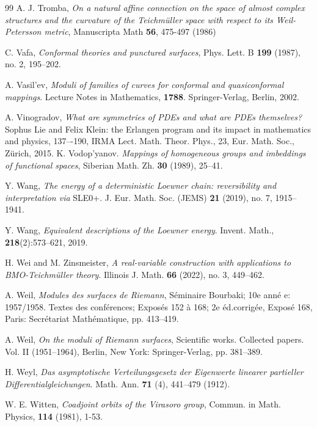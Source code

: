 \documentclass[12pt]{amsart}
\theoremstyle{plain}
\theoremstyle{definition}
\theoremstyle{remark}
\numberwithin{equation}{section} %
\numberwithin{figure}{section} %
\begin{document}
\begin{thebibliography}{99}
 A. J. Tromba, {\it On a natural affine connection on the space of almost complex
structures and the curvature of the Teichm\"uller space with respect to its Weil-
Petersson metric}, Manuscripta Math {\bf 56}, 475-497 (1986)

 C. Vafa, \emph{Conformal theories and punctured surfaces}, Phys. Lett. B \textbf{199} (1987), no. 2, 195--202.

 A. Vasil'ev,  {\it Moduli of families of curves for conformal and quasiconformal mappings}. Lecture Notes in Mathematics, {\bf 1788}. Springer-Verlag, Berlin, 2002.

 A. Vinogradov, {\it What are symmetries of \emph{PDEs} and what are \emph{PDEs} themselves?}  Sophus Lie and Felix Klein: the Erlangen program and its impact in mathematics and physics, 137–-190,
IRMA Lect. Math. Theor. Phys., 23, Eur. Math. Soc., Z\"urich, 2015. 
 K. Vodop'yanov. {\it Mappings of homogeneous groups and imbeddings of functional spaces}, Siberian Math. Zh. {\bf 30} (1989), 25--41.

 Y. Wang,  {\it {The energy of a deterministic Loewner chain: reversibility and interpretation via}} SLE0+. J. Eur. Math. Soc. (JEMS) {\bf 21} (2019), no. 7, 1915–1941.

 Y. Wang, {\it Equivalent descriptions of the Loewner energy}. Invent. Math., {\bf 218}(2):573–621, 2019.

H. Wei and M. Zinsmeister, {\it A real-variable construction with applications to BMO-Teichmüller theory}. Illinois J. Math. {\bf 66} (2022), no. 3, 449–462. 

  A. Weil, {\it Modules des surfaces de Riemann}, S\'eminaire Bourbaki; 10e ann\'e e: 1957/1958. Textes des conf\'erences; Expos\'es 152 \`a 168; 2e \'ed.corrig\'ee, Expos\'e 168, Paris: Secr\'etariat Math\'ematique, pp. 413–419.

 A. Weil, {\it On the moduli of Riemann surfaces}, Scientific works. Collected papers. Vol. II (1951--1964), Berlin, New York: Springer-Verlag, pp. 381–389.


 H. Weyl,  {\it Das asymptotische Verteilungsgesetz der Eigenwerte linearer partieller Differentialgleichungen}. Math. Ann. {\bf 71} (4), 441–479 (1912).

 W. E. Witten, {\it Coadjoint orbits of the Virasoro group}, Commun. in Math. Physics, {\bf 114}
(1981), 1-53.


\end{thebibliography}
\end{document}
